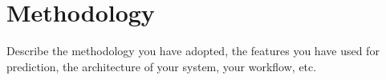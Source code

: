 \section{Methodology}
\label{sec:methodology}

Describe the methodology you have adopted, the features you have used for prediction, the architecture of your system, your workflow, etc.